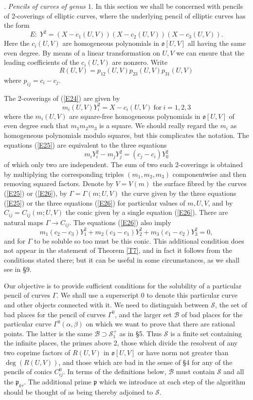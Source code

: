 \documentclass[12pt]{article}
\def\fo{{\mathfrak o}}
\def\fp{{\mathfrak p}}
\def\ga{{\alpha}}
\def\gb{{\beta}}
\def\gG{{\Gamma}}
\def\sB{{\mathcal B}}
\def\sS{{\mathcal S}}
\def\beq{\begin{equation} \label}
\begin{document}
. \emph{Pencils of curves of genus $1$}. \newline
In this section we shall be concerned with pencils of
2-coverings of elliptic curves, where the underlying pencil
of elliptic curves has the form
\beq{E24} E:\;Y^2=(X-c_1(U,V))(X-c_2(U,V))(X-c_3(U,V)). \end{equation}
Here the $c_i(U,V)$ are homogeneous polynomials in $\fo[U,V]$ all having the
same even degree. By means of a linear transformation on $U,V$ we can ensure
that the leading coefficients of the $c_i(U,V)$ are nonzero. Write
\[ R(U,V)=p_{12}(U,V)p_{23}(U,V)p_{31}(U,V) \]
where $p_{ij}=c_i-c_j$.

The 2-coverings of (\ref{E24}) are given by
\beq{E25} m_i(U,V)Y_i^2=X-c_i(U,V) {\mathrm{~for~}} i=1,2,3 \end{equation}
where the $m_i(U,V)$ are square-free homogeneous polynomials in $\fo[U,V]$ of
even degree such that $m_1m_2m_3$ is a square. We should really regard the
$m_i$ as homogeneous polynomials modulo squares, but this complicates the
notation. The equations (\ref{E25})
are equivalent to the three equations
\beq{E26} m_iY_i^2-m_jY_j^2=(c_j-c_i)Y_0^2 \end{equation}
of which only two are independent. The sum of two such 2-coverings is obtained
by multiplying the corresponding triples $(m_1,m_2,m_3)$ componentwise and then
removing squared factors. Denote by $V=V(m)$ the surface fibred by the curves
(\ref{E25}) or (\ref{E26}), by $\gG=\gG(m;U,V)$ the curve given by the three
equations (\ref{E25}) or the three equations (\ref{E26}) for particular
values of $m,U,V$, and by
$C_{ij}=C_{ij}(m;U,V)$ the conic given by a single equation (\ref{E26}).
There are natural maps $\gG\rightarrow C_{ij}$. The equations
(\ref{E26}) also imply
\beq{E76} m_1(c_2-c_3)Y_1^2+m_2(c_3-c_1)Y_2^2+m_3(c_1-c_2)Y_3^2=0,
\end{equation}
and for $\gG$ to be soluble so too must be this conic. This
additional condition does not appear in the statement of
Theorem \ref{T7}, and in fact it follows from the conditions
stated there; but it can be useful in some circumstances, as
we shall see in \S9.

Our objective is to provide sufficient conditions for the
solubility of a particular pencil of curves $\gG$. We shall
use a superscript 0 to denote this particular curve and other
objects connected with it. We need to distinguish
between $\sS$, the set of bad places for the
pencil of curves $\gG^0$, and the larger set $\sB$ of bad places for the
particular curve $\gG^0(\ga,\gb)$ on which we want to
prove that there are rational
points. The latter is the same $\sB\supset\sS_1^+$ as in \S5.
Thus $\sS$ is a finite set containing the infinite places, the primes
above 2, those which divide the resolvent of any two coprime factors of
$R(U,V)$ in $\fo[U,V]$ or have norm not
greater than $\deg(R(U,V))$, and those which are bad in the sense of \S4 for
any of the pencils of conics $C^0_{ij}$. In terms
of the definitions below, $\sB$ must contain $\sS$ and all
the $\fp_{k\tau}$. The additional prime $\fp$ which we
introduce at each step of the algorithm should be thought of
as being thereby adjoined to $\sS$.
\end{document}
